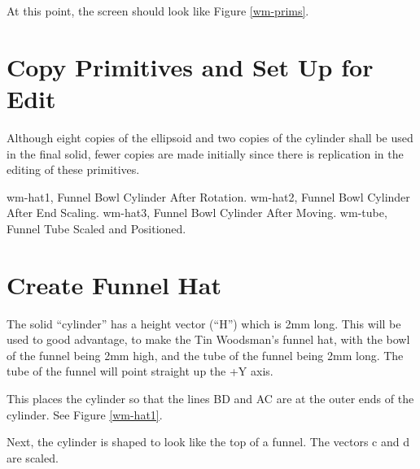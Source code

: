 At this point, the screen should look like Figure \ref{wm-prims}.

\section{Copy Primitives and Set Up for Edit}

Although eight copies of the ellipsoid and two copies of the cylinder 
shall be used in the final solid, fewer copies are made initially since there
is replication in the editing of these primitives.


\mfig wm-hat1, Funnel Bowl Cylinder After Rotation.
\mfig wm-hat2, Funnel Bowl Cylinder After End Scaling.
\mfig wm-hat3, Funnel Bowl Cylinder After Moving.
\mfig wm-tube, Funnel Tube Scaled and Positioned.
\section{Create Funnel Hat}

The solid ``cylinder'' has a height vector (``H'') which is 2mm
long.
This will be used to good advantage, to make the Tin Woodsman's
funnel hat, with the bowl of the funnel being 2mm high,
and the tube of the funnel being 2mm long.
The tube of the funnel will point straight up the +Y axis.


This places the cylinder so that the lines BD and AC are at the outer 
ends of the cylinder.  See Figure \ref{wm-hat1}.

Next, the cylinder is shaped to look like the top of a funnel.
The vectors c and d are scaled.

